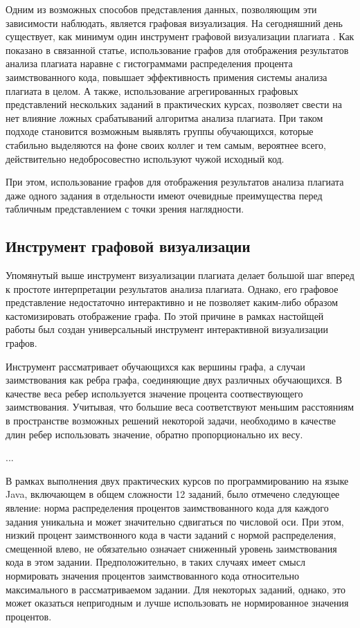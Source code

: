 \documentclass{article}
\begin{document}
Одним из возможных способов представления данных, позволяющим эти зависимости наблюдать, является графовая визуализация. На сегодняшний день существует, как минимум один инструмент графовой визуализации плагиата \citep{plagiarismGraph}. Как показано в связанной статье, использование графов для отображения результатов анализа плагиата наравне с гистограммами распределения процента заимствованного кода, повышает эффективность примения системы анализа плагиата в целом. А также, использование агрегированных графовых представлений нескольких заданий в практических курсах, позволяет свести на нет влияние ложных срабатываний алгоритма анализа плагиата. При таком подходе становится возможным выявлять группы обучающихся, которые стабильно выделяются на фоне своих коллег и тем самым, вероятнее всего, действительно недобросовестно используют чужой исходный код.

При этом, использование графов для отображения результатов анализа плагиата даже одного задания в отдельности имеют очевидные преимущества перед табличным представлением с точки зрения наглядности.

\subsection{Инструмент графовой визуализации}

Упомянутый выше инструмент визуализации плагиата делает большой шаг вперед к простоте интерпретации результатов анализа плагиата. Однако, его графовое представление недостаточно интерактивно и не позволяет каким-либо образом кастомизировать отображение графа. По этой причине в рамках настойщей работы был создан универсальный инструмент интерактивной визуализации графов.

Инструмент рассматривает обучающихся как вершины графа, а случаи заимствования как ребра графа, соединяющие двух различных обучающихся. В качестве веса ребер используется значение процента соотвествующего заимствования. Учитывая, что большие веса соответствуют меньшим расстояниям в пространстве возможных решений некоторой задачи, необходимо в качестве длин ребер использовать значение, обратно пропорционально их весу.

...

В рамках выполнения двух практических курсов по программированию на языке Java, включающем в общем сложности 12 заданий, было отмечено следующее явление: норма распределения процентов заимствованного кода для каждого задания уникальна и может значительно сдвигаться по числовой оси. При этом, низкий процент заимствонного кода в части заданий с нормой распределения, смещенной влево, не обязательно означает сниженный уровень заимствования кода в этом задании. Предположительно, в таких случаях имеет смысл нормировать значения процентов заимствованного кода относительно максимального в рассматриваемом задании. Для некоторых заданий, однако, это может оказаться непригодным и лучше использовать не нормированное значения процентов.
\end{document}
